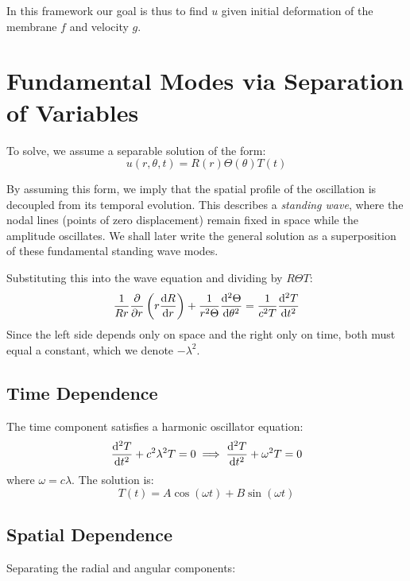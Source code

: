 \documentclass[11pt, letterpaper]{article}
\begin{document}
In this framework our goal is thus to find $u$ given initial deformation of the membrane $f$ and velocity $g$.

\section{Fundamental Modes via Separation of Variables}

To solve, we assume a separable solution of the form:
\begin{equation}
    u(r, \theta, t) = R(r) \Theta(\theta) T(t)
\end{equation}

By assuming this form, we imply that the spatial profile of the oscillation is decoupled from its temporal evolution. 
This describes a \textit{standing wave}, where the nodal lines (points of zero displacement) remain fixed in space while the amplitude oscillates. 
We shall later write the general solution as a superposition of these fundamental standing wave modes.

Substituting this into the wave equation and dividing by $R\Theta T$:
\begin{equation}
    \frac{1}{R r} \pdv{r} \left(r \dv{R}{r}\right) + \frac{1}{r^{2} \Theta} \dv[2]{\Theta}{\theta} = \frac{1}{c^{2}T} \dv[2]{T}{t}
\end{equation}
Since the left side depends only on space and the right only on time, both must equal a constant, which we denote $-\lambda^2$.

\subsection{Time Dependence}

The time component satisfies a harmonic oscillator equation:
\begin{equation}
    \dv[2]{T}{t} + c^2\lambda^2 T = 0 \implies \dv[2]{T}{t} + \omega^2 T = 0
\end{equation}
where $\omega = c\lambda$. The solution is:
\begin{equation}
    T(t) = A \cos(\omega t) + B \sin(\omega t)
\end{equation}

\subsection{Spatial Dependence}

Separating the radial and angular components:
\end{document}

